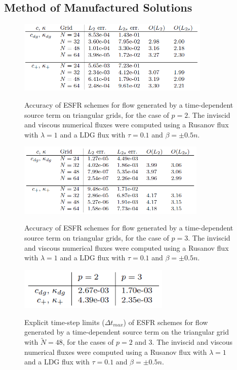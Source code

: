\graphicspath{{figures_manufactured/}}%


\subsection{Method of Manufactured Solutions}

\begin{figure}
\centering
\includegraphics[height=35mm]{table_917} \\
\caption{Accuracy of ESFR schemes for flow generated by a time-dependent source term on triangular grids, for the case of $p = 2$. The inviscid and viscous numerical fluxes were computed using a Rusanov flux with $\lambda = 1$ and a LDG flux with $\tau = 0.1$ and $\beta = \pm 0.5n$.}
\label{fig:table_917}
\end{figure}

\begin{figure}
\centering
\includegraphics[height=35mm]{table_918} \\
\caption{Accuracy of ESFR schemes for flow generated by a time-dependent source term on triangular grids, for the case of $p = 3$. The inviscid and viscous numerical fluxes were computed using a Rusanov flux with $\lambda = 1$ and a LDG flux with $\tau = 0.1$ and $\beta = \pm 0.5n$.}
\label{fig:table_918}
\end{figure}

\begin{figure}
\centering
\includegraphics[height=20mm]{table_919} \\
\caption{Explicit time-step limits ($\Delta t_{max}$) of ESFR schemes for flow generated by a time-dependent source term on the triangular grid with $\tilde{N} = 48$, for the cases of $p = 2$ and $3$. The inviscid and viscous numerical fluxes were computed using a Rusanov flux with $\lambda = 1$ and a LDG flux with $\tau = 0.1$ and $\beta = \pm 0.5n$.}
\label{fig:table_919}
\end{figure}


